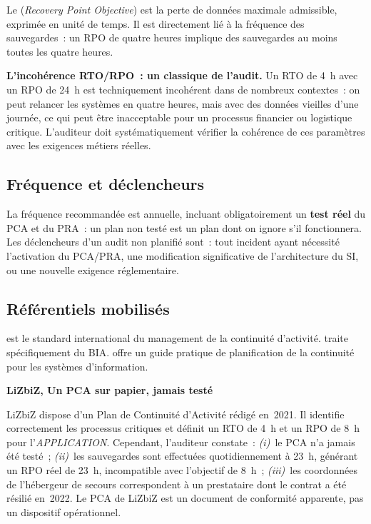 Le  (\textit{Recovery Point Objective}) est la perte de données
maximale admissible, exprimée en unité de temps. Il est directement lié à la fréquence
des sauvegardes~: un RPO de quatre heures implique des sauvegardes au moins toutes les
quatre heures.

\begin{boxalert}
\textbf{L'incohérence RTO/RPO~: un classique de l'audit.}
Un RTO de 4~h avec un RPO de 24~h est techniquement incohérent dans de nombreux
contextes~: on peut relancer les systèmes en quatre heures, mais avec des données
vieilles d'une journée, ce qui peut être inacceptable pour un processus financier ou
logistique critique. L'auditeur doit systématiquement vérifier la cohérence de ces
paramètres avec les exigences métiers réelles.
\end{boxalert}

\subsection{Fréquence et déclencheurs}

La fréquence recommandée est annuelle, incluant obligatoirement un \textbf{test réel}
du PCA et du PRA~: un plan non testé est un plan dont on ignore s'il fonctionnera.
Les déclencheurs d'un audit non planifié sont~: tout incident ayant nécessité
l'activation du PCA/PRA, une modification significative de l'architecture du SI,
ou une nouvelle exigence réglementaire.

\subsection{Référentiels mobilisés}

 est le standard international du management de la continuité
d'activité.  traite spécifiquement du BIA. 
offre un guide pratique de planification de la continuité pour les systèmes
d'information.

\begin{boxlizbiz}
\textbf{LiZbiZ, Un PCA sur papier, jamais testé}

LiZbiZ dispose d'un Plan de Continuité d'Activité rédigé en~2021. Il identifie
correctement les processus critiques et définit un RTO de 4~h et un RPO de 8~h pour
l'\textit{APPLICATION}. Cependant, l'auditeur constate~: \textit{(i)}~le PCA n'a
jamais été testé~; \textit{(ii)}~les sauvegardes sont effectuées quotidiennement à
23~h, générant un RPO réel de 23~h, incompatible avec l'objectif de 8~h~;
\textit{(iii)}~les coordonnées de l'hébergeur de secours correspondent à un
prestataire dont le contrat a été résilié en~2022. Le PCA de LiZbiZ est un document
de conformité apparente, pas un dispositif opérationnel.
\end{boxlizbiz}


